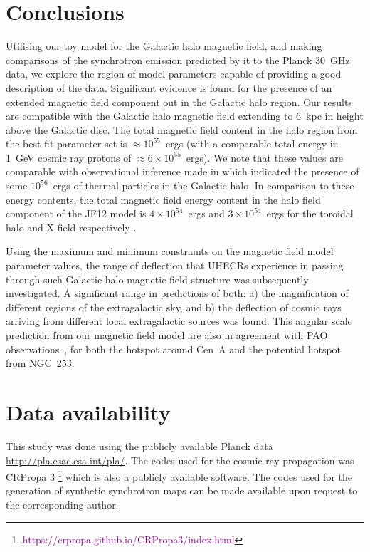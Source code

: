 \documentclass[usenatbib]{mnras}
\begin{document}
\section{Conclusions}
\label{Conclusions}

Utilising our toy model for the Galactic halo magnetic field, and making comparisons of the synchrotron emission predicted by it to the Planck 30~GHz data, we explore the region of model parameters capable of providing a good description of the data. Significant evidence is found for the presence of an extended magnetic field component out in the Galactic halo region. Our results are compatible with the Galactic halo magnetic field extending to 6~kpc in height above the Galactic disc. The total magnetic field content in the halo region from the best fit parameter set is $\approx 10^{55}$~ergs (with a comparable total energy in 1~GeV cosmic ray protons of $\approx 6\times 10^{55}$~ergs). We note that these values are comparable with observational inference made in \cite{eROSITA} which indicated the presence of some $10^{56}$~ergs of thermal particles in the Galactic halo.
In comparison to these energy contents, the total magnetic field energy content in the halo field component of the JF12 model is $4\times 10^{54}$~ergs and $3\times  10^{54}$~ergs for the toroidal halo and X-field respectively \citep{Taylor_2019}.

Using the maximum and minimum constraints on the magnetic field model parameter values, the range of deflection that UHECRs experience in passing through such Galactic halo magnetic field structure was subsequently investigated. A significant range in predictions of both: a) the magnification of different regions of the extragalactic sky, and b) the deflection of cosmic rays arriving from different local extragalactic sources was found. This angular scale prediction from our magnetic field model are also in agreement with PAO observations~\citep{PierreAuger_2014, Auger_ICRC_2021}, for both the hotspot around Cen~A and the potential hotspot from NGC~253.

\section*{Data availability}
This study was done using the publicly available Planck data \hyperlink{Planck}{http://pla.esac.esa.int/pla/}. The codes used for the cosmic ray propagation was CRPropa 3 \citep{CRPropa3_2016}\footnote{\textcolor{purple}{https://crpropa.github.io/CRPropa3/index.html}} which is also a publicly available software. The codes used for the generation of synthetic synchrotron maps can be made available upon request to the corresponding author. 
\end{document}
